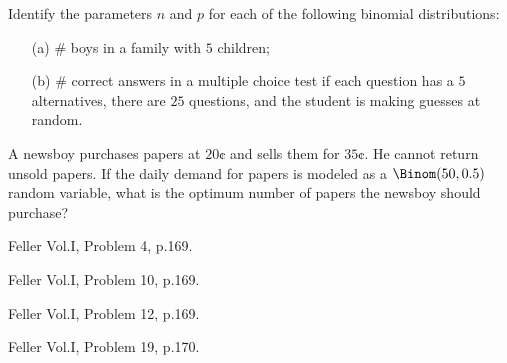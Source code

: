 \begin{problem}[Handout 8, \# 2]
  Identify the parameters \(n\) and \(p\) for each of the following
  binomial distributions:
  \begin{itemize}
  \item[(a)] \(\#\) boys in a family with \(5\) children;
  \item[(b)] \(\#\) correct answers in a multiple choice test if each
    question has a \(5\) alternatives, there are \(25\) questions, and the
    student is making guesses at random.
  \end{itemize}
\end{problem}
\begin{solution}

\end{solution}
\newpage

\begin{problem}[Handout 8, \# 10]
  A newsboy purchases papers at \(20\cent\) and sells them for
  \(35\cent\). He cannot return unsold papers. If the daily demand for
  papers is modeled as a \(\Binom(50,0.5)\) random variable, what is the
  optimum number of papers the newsboy should purchase?
\end{problem}
\begin{solution}

\end{solution}
\newpage

\begin{problem}[Handout 8, \# 12]
  Feller Vol.\@ I, Problem 4, p.\@ 169.
\end{problem}
\begin{solution}

\end{solution}
\newpage

\begin{problem}[Handout 8, \# 13]
  Feller Vol.\@ I, Problem 10, p.\@ 169.
\end{problem}
\begin{solution}

\end{solution}
\newpage

\begin{problem}[Handout 8, \# 14]
  Feller Vol.\@ I, Problem 12, p.\@ 169.
\end{problem}
\begin{solution}

\end{solution}
\newpage

\begin{problem}[Handout 8, \# 15]
  Feller Vol.\@ I, Problem 19, p.\@ 170.
\end{problem}
\begin{solution}

\end{solution}
\newpage

